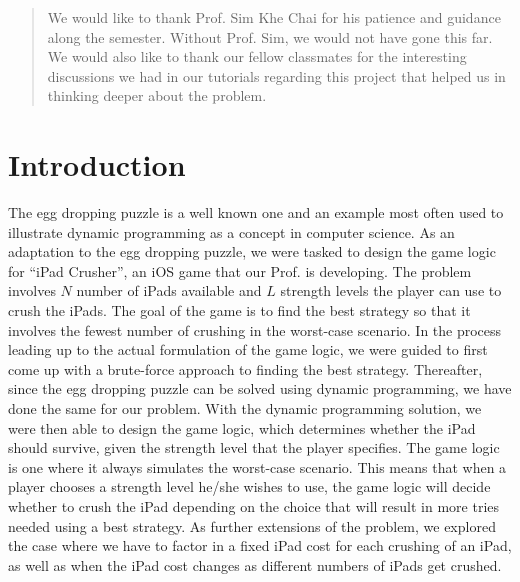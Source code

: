 \documentclass[12pt,a4paper,oneside]{report}
\begin{document}
\renewcommand{\abstractname}{Acknowledgements}
\begin{abstract}
\setcounter{page}{3}
\thispagestyle{plain}
\onehalfspacing
{}
We would like to thank Prof. Sim Khe Chai for his patience and guidance along the semester. Without Prof. Sim, we would not have gone this far. We would also like to thank our fellow classmates for the interesting discussions we had in our tutorials regarding this project that helped us in thinking deeper about the problem.
\end{abstract}

\onehalfspacing
\tableofcontents
\thispagestyle{empty}

\chapter{Introduction}
\setcounter{page}{1}
The egg dropping puzzle is a well known one and an example most often used to illustrate dynamic programming as a concept in computer science. As an adaptation to the egg dropping puzzle, we were tasked to design the game logic for ``iPad Crusher'', an iOS game that our Prof. is developing. The problem involves $N$ number of iPads available and $L$ strength levels the player can use to crush the iPads. The goal of the game is to find the best strategy so that it involves the fewest number of crushing in the worst-case scenario. In the process leading up to the actual formulation of the game logic, we were guided to first come up with a brute-force approach to finding the best strategy. Thereafter, since the egg dropping puzzle can be solved using dynamic programming, we have done the same for our problem. With the dynamic programming solution, we were then able to design the game logic, which determines whether the iPad should survive, given the strength level that the player specifies. The game logic is one where it always simulates the worst-case scenario. This means that when a player chooses a strength level he/she wishes to use, the game logic will decide whether to crush the iPad depending on the choice that will result in more tries needed using a best strategy. As further extensions of the problem, we explored the case where we have to factor in a fixed iPad cost for each crushing of an iPad, as well as when the iPad cost changes as different numbers of iPads get crushed.
\end{document}

